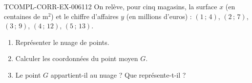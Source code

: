 \begin{exercice}{TCOMPL-CORR-EX-006}{1}{12}
On relève, pour cinq magasins, la surface $x$ (en centaines de m$^2$) et le
chiffre d'affaires $y$ (en millions d'euros) :
$(1\,;\,4)$, $(2\,;\,7)$, $(3\,;\,9)$, $(4\,;\,12)$, $(5\,;\,13)$.
\begin{enumerate}
  \item Représenter le nuage de points.
  \item Calculer les coordonnées du point moyen $G$.
  \item Le point $G$ appartient-il au nuage ? Que représente-t-il ?
\end{enumerate}
\end{exercice}
